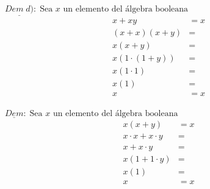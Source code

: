 \begin{multicols}{2}
	\noindent
	$\underline{Dem \;d)}:\; \text{Sea $x$ un elemento del álgebra booleana}$
	\begin{align*}
		x+xy            & =x \\
		(x+x)(x+y)      & =  \\
		x(x+y)          & =  \\
		x(1\cdot (1+y)) & =  \\
		x(1\cdot 1)     & =  \\
		x(1)            & =  \\
		x               & =x \\
	\end{align*}

	\columnbreak
	\noindent
	$\underline{Dem}:\; \text{Sea $x$ un elemento del álgebra booleana}$
	\begin{align*}
		x(x+y)             & =x  \\
		x\cdot x +x\cdot y & =   \\
		x +x\cdot y        & =   \\
		x (1 + 1\cdot y)   & =   \\
		x (1)              & =   \\
		x                  & = x
	\end{align*}
\end{multicols}
